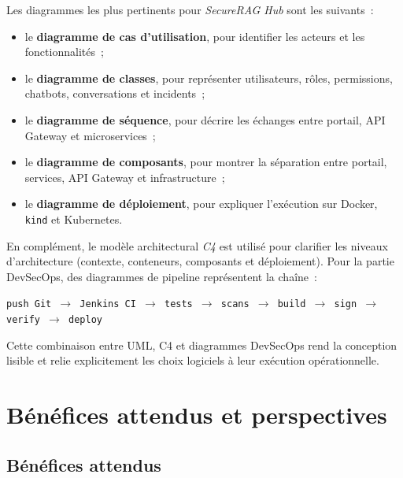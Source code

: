 Les diagrammes les plus pertinents pour \textit{SecureRAG Hub} sont les suivants~:
\begin{itemize}
    \item le \textbf{diagramme de cas d'utilisation}, pour identifier les acteurs et les fonctionnalités~;
    \item le \textbf{diagramme de classes}, pour représenter utilisateurs, rôles, permissions, chatbots, conversations et incidents~;
    \item le \textbf{diagramme de séquence}, pour décrire les échanges entre portail, API Gateway et microservices~;
    \item le \textbf{diagramme de composants}, pour montrer la séparation entre portail, services, API Gateway et infrastructure~;
    \item le \textbf{diagramme de déploiement}, pour expliquer l'exécution sur Docker, \texttt{kind} et Kubernetes.
\end{itemize}

En complément, le modèle architectural \textit{C4} \cite{brown_c4_model} est utilisé pour clarifier les niveaux d'architecture (contexte, conteneurs, composants et déploiement). Pour la partie DevSecOps, des diagrammes de pipeline représentent la chaîne~:

\begin{center}
\texttt{push Git $\rightarrow$ Jenkins CI $\rightarrow$ tests $\rightarrow$ scans $\rightarrow$ build $\rightarrow$ sign $\rightarrow$ verify $\rightarrow$ deploy}
\end{center}

Cette combinaison entre UML, C4 et diagrammes DevSecOps rend la conception lisible et relie explicitement les choix logiciels à leur exécution opérationnelle.

\section{Bénéfices attendus et perspectives}
\label{sec:benefices}

\subsection{Bénéfices attendus}

